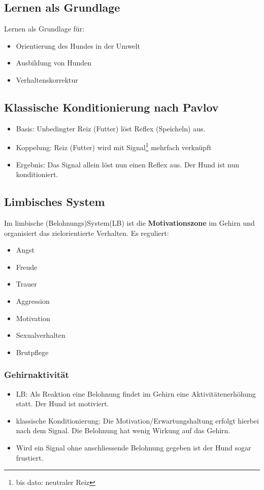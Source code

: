     \subsection{Lernen als Grundlage}
        Lernen als Grundlage für:
        \begin{itemize}
            \item Orientierung des Hundes in der Umwelt
            \item Ausbildung von Hunden
            \item Verhaltenskorrektur
        \end{itemize}

    \subsection{Klassische Konditionierung nach Pavlov}
        \begin{itemize}
            \item Basis: Unbedingter Reiz (Futter) löst Reflex (Speicheln) aus.
            \item Koppelung: Reiz (Futter) wird mit Signal\footnote{bis dato: neutraler Reiz} mehrfach verknüpft
            \item Ergebnis: Das Signal allein löst nun einen Reflex aus. Der Hund ist nun konditioniert.
        \end{itemize}

    \subsection{Limbisches System}
        Im limbische (Belohnungs)System(LB) ist die \textbf{Motivationszone} im Gehirn und organisiert das zielorientierte Verhalten. Es reguliert:
        \begin{itemize}
            \item Angst
            \item Freude
            \item Trauer
            \item Aggression
            \item Motivation
            \item Sexualverhalten
            \item Brutpflege
        \end{itemize}

        \subsubsection{Gehirnaktivität}
            \begin{itemize}
                \item LB: Als Reaktion eine Belohnung findet im Gehirn eine Aktivitätenerhöhung statt. Der Hund ist motiviert.
                \item klassische Konditionierung: Die Motivation/Erwartungshaltung erfolgt hierbei nach dem Signal. Die Belohnung hat wenig Wirkung auf das Gehirn.
                \item Wird ein Signal ohne anschliessende Belohnung gegeben ist der Hund sogar frustiert.
            \end{itemize}

